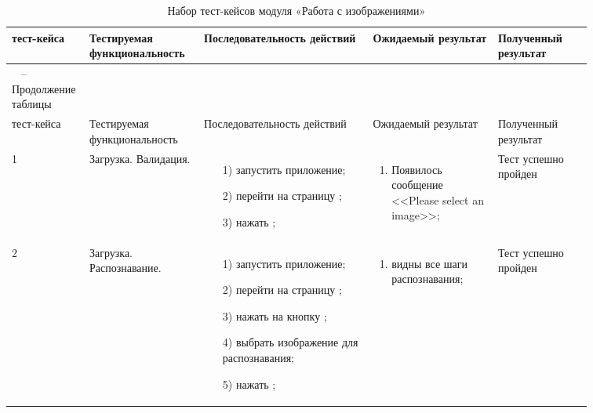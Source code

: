 \begin{longtable}{| >{\raggedright}m{0.06\linewidth} 
                  | >{\raggedright}m{0.18\linewidth} 
                  | >{\raggedright}m{0.27\linewidth} 
                  | >{\raggedright}m{0.2\linewidth} 
                  | >{\raggedright\arraybackslash}m{0.15\linewidth}|}
	\caption{Набор тест-кейсов модуля «Работа с изображениями»}
	\label{table:testing:own_content} \\

   \hline
   \No{} тест-кейса & Тестируемая функциональность & Последовательность действий & Ожидаемый результат & Полученный результат\\
   \endfirsthead

	\multicolumn{3}{c}%
	{{ \raggedleft \tablename\ \thetable{} -- Продолжение таблицы}} \\

	\hline
   	\No{} тест-кейса & Тестируемая функциональность & Последовательность действий & Ожидаемый результат & Полученный результат\\

	\hline 
	\endhead

	\hline
	1 & Загрузка. Валидация. & 
   			\begin{enumerate}
				\item[1)] запустить приложение;
				\item[2)] перейти на страницу \imrPage{};
				\item[3)] нажать \submitButton{};
			\end{enumerate}
   			& 
   			\begin{enumerate}
   				\item Появилось сообщение <<Please select an image>>;
   			\end{enumerate}
   			& Тест успешно пройден \\
	\hline
	2 & Загрузка. Распознавание. & 
   			\begin{enumerate}
				\item[1)] запустить приложение;
				\item[2)] перейти на страницу \imrPage{};
				\item[3)] нажать на кнопку \selectButton{};
				\item[4)] выбрать изображение для распознавания;
				\item[5)] нажать \submitButton{};
			\end{enumerate}
   			& 
   			\begin{enumerate}
   				\item видны все шаги распознавания;
   			\end{enumerate}
   			& Тест успешно пройден \\ 


\end{longtable}
